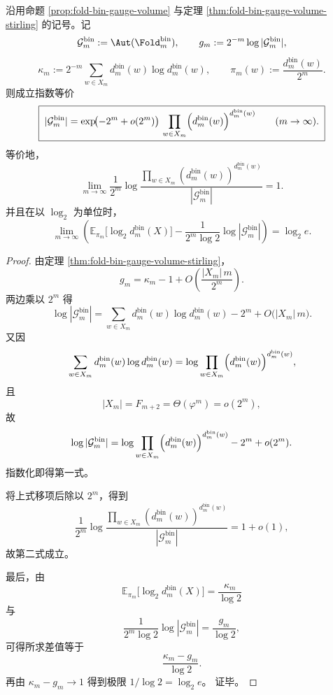 \begin{theorem}\label{thm:xi-gauge-volume-boltzmann-stirling-exponential}
沿用命题 \ref{prop:fold-bin-gauge-volume} 与定理 \ref{thm:fold-bin-gauge-volume-stirling}
的记号。记
\[
\mathcal G_m^{\mathrm{bin}}:=\Aut(\Fold_m^{\mathrm{bin}}),
\qquad
g_m:=2^{-m}\log|\mathcal G_m^{\mathrm{bin}}|,
\]
\[
\kappa_m:=2^{-m}\sum_{w\in X_m}d_m^{\mathrm{bin}}(w)\log d_m^{\mathrm{bin}}(w),
\qquad
\pi_m(w):=\frac{d_m^{\mathrm{bin}}(w)}{2^m}.
\]
则成立指数等价
\[
\boxed{\;
|\mathcal G_m^{\mathrm{bin}}|
=
\exp\!\bigl(-2^m+o(2^m)\bigr)\,
\prod_{w\in X_m}\Bigl(d_m^{\mathrm{bin}}(w)\Bigr)^{d_m^{\mathrm{bin}}(w)}
\qquad(m\to\infty).\;}
\]
等价地，
\[
\boxed{\;
\lim_{m\to\infty}
\frac{1}{2^m}\log
\frac{\prod_{w\in X_m}(d_m^{\mathrm{bin}}(w))^{d_m^{\mathrm{bin}}(w)}}{|\mathcal G_m^{\mathrm{bin}}|}
=1.\;}
\]
并且在以 \(\log_2\) 为单位时，
\[
\boxed{\;
\lim_{m\to\infty}
\left(
\mathbb E_{\pi_m}\!\bigl[\log_2 d_m^{\mathrm{bin}}(X)\bigr]
-\frac{1}{2^m\log 2}\log|\mathcal G_m^{\mathrm{bin}}|
\right)
=
\log_2 e.\;}
\]
\end{theorem}
\begin{proof}
由定理 \ref{thm:fold-bin-gauge-volume-stirling}，
\[
g_m=\kappa_m-1+O\!\left(\frac{|X_m|\,m}{2^m}\right).
\]
两边乘以 \(2^m\) 得
\[
\log|\mathcal G_m^{\mathrm{bin}}|
=
\sum_{w\in X_m}d_m^{\mathrm{bin}}(w)\log d_m^{\mathrm{bin}}(w)
-2^m
+O\!\bigl(|X_m|\,m\bigr).
\]
又因
\[
\sum_{w\in X_m}d_m^{\mathrm{bin}}(w)\log d_m^{\mathrm{bin}}(w)
=
\log \prod_{w\in X_m}\Bigl(d_m^{\mathrm{bin}}(w)\Bigr)^{d_m^{\mathrm{bin}}(w)},
\]
且
\[
|X_m|=F_{m+2}=\Theta(\varphi^m)=o(2^m),
\]
故
\[
\log|\mathcal G_m^{\mathrm{bin}}|
=
\log \prod_{w\in X_m}\Bigl(d_m^{\mathrm{bin}}(w)\Bigr)^{d_m^{\mathrm{bin}}(w)}
-2^m+o(2^m).
\]
指数化即得第一式。
\par
将上式移项后除以 \(2^m\)，得到
\[
\frac{1}{2^m}\log
\frac{\prod_{w\in X_m}(d_m^{\mathrm{bin}}(w))^{d_m^{\mathrm{bin}}(w)}}{|\mathcal G_m^{\mathrm{bin}}|}
=1+o(1),
\]
故第二式成立。
\par
最后，由
\[
\mathbb E_{\pi_m}\!\bigl[\log_2 d_m^{\mathrm{bin}}(X)\bigr]
=
\frac{\kappa_m}{\log 2}
\]
与
\[
\frac{1}{2^m\log 2}\log|\mathcal G_m^{\mathrm{bin}}|
=
\frac{g_m}{\log 2},
\]
可得所求差值等于
\[
\frac{\kappa_m-g_m}{\log 2}.
\]
再由
\(
\kappa_m-g_m\to 1
\)
得到极限
\(
1/\log 2=\log_2 e
\)。
证毕。
\end{proof}

\endinput


